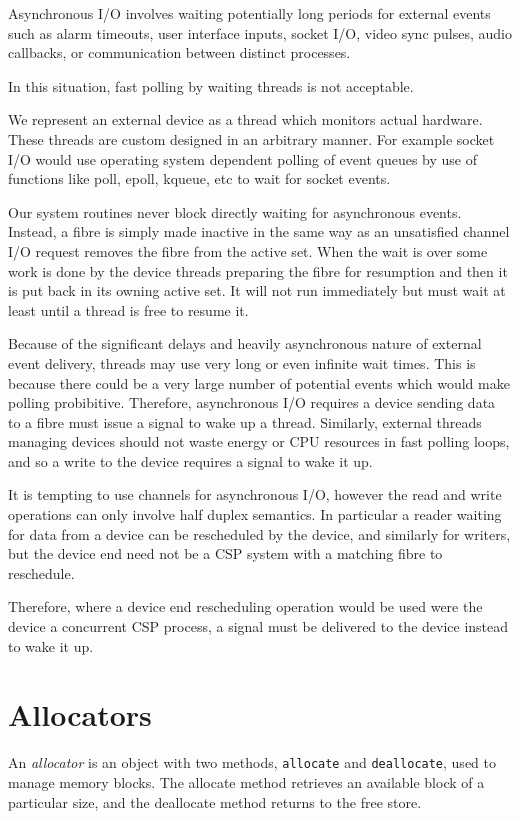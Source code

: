 \documentclass[oneside]{book}
\begin{document}
Asynchronous I/O involves waiting potentially long periods for
external events such as alarm timeouts, user interface inputs,
socket I/O, video sync pulses, audio callbacks, or communication
between distinct processes.

In this situation, fast polling by waiting threads is not acceptable.

We represent an external device as a thread which monitors actual hardware.
These threads are custom designed in an arbitrary manner. For example
socket I/O would use operating system dependent polling of event queues
by use of functions like poll, epoll, kqueue, etc to wait for
socket events.

Our system routines never block directly waiting for asynchronous events.
Instead, a fibre is simply made inactive in the same way as an unsatisfied
channel I/O request removes the fibre from the active set. When the 
wait is over some work is done by the device threads preparing the
fibre for resumption and then it is put back in its owning active set.
It will not run immediately but must wait at least until a thread
is free to resume it.

Because of the significant delays and heavily asynchronous nature
of external event delivery, threads may use very long or even infinite wait times.
This is because there could be a very large number of potential
events which would make polling probibitive. Therefore, asynchronous
I/O requires a device sending data to a fibre must issue a signal to
wake up a thread. Similarly, external threads managing devices
should not waste energy or CPU resources in fast polling loops,
and so a write to the device requires a signal to wake it up.

It is tempting to use channels for asynchronous I/O, however the
read and write operations can only involve half duplex semantics.
In particular a reader waiting for data from a device can be rescheduled
by the device, and similarly for writers, but the device end need not
be a CSP system with a matching fibre to reschedule.

Therefore, where a device end rescheduling operation would be used
were the device a concurrent CSP process, a signal must be delivered
to the device instead to wake it up.


\chapter{Allocators}
An {\em allocator} is an object with two methods, \verb$allocate$ and 
\verb$deallocate$, used to manage memory blocks. The allocate method
retrieves an available block of a particular size, and the deallocate
method returns to the free store.
\end{document}

